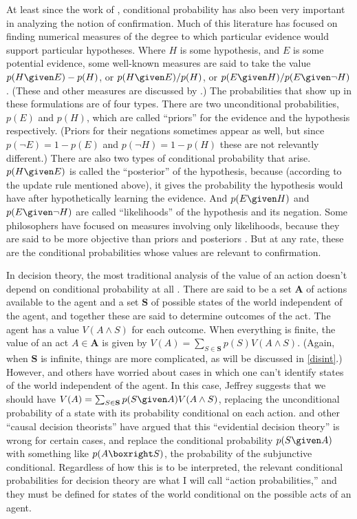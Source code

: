 At least since the work of \citet{jhl}, conditional probability has also been very important in analyzing the notion of confirmation. Much of this literature has focused on finding numerical measures of the degree to which particular evidence would support particular hypotheses. Where $H$ is some hypothesis, and $E$ is some potential evidence, some well-known measures are said to take the value $p(H \given E)-p(H)$, or $p(H \given E)/p(H)$, or $p(E \given H)/p(E \given \lnot H)$. (These and other measures are discussed by \citealp{meassens}.) The probabilities that show up in these formulations are of four types. There are two unconditional probabilities, $p(E)$ and $p(H)$, which are called ``priors'' for the evidence and the hypothesis respectively. (Priors for their negations sometimes appear as well, but since $p(\lnot E)=1-p(E)$ and $p(\lnot H)=1-p(H)$ these are not relevantly different.) There are also two types of conditional probability that arise. $p(H \given E)$ is called the ``posterior'' of the hypothesis, because (according to the update rule mentioned above), it gives the probability the hypothesis would have after hypothetically learning the evidence. And $p(E \given H)$ and $p(E \given \lnot H)$ are called ``likelihoods'' of the hypothesis and its negation. Some philosophers have focused on measures involving only likelihoods, because they are said to be more objective than priors and posteriors \citep{royall}. But at any rate, these are the conditional probabilities whose values are relevant to confirmation.

In decision theory, the most traditional analysis of the value of an action doesn't depend on conditional probability at all \citep{savage}. There are said to be a set $\mathbf{A}$ of actions available to the agent and a set $\mathbf{S}$ of possible states of the world independent of the agent, and together these are said to determine outcomes of the act. The agent has a value $V(A\land S)$ for each outcome. When everything is finite, the value of an act $A\in\mathbf{A}$ is given by $V(A)=\sum_{S\in\mathbf{S}}p(S)V(A\land S)$. (Again, when $\mathbf{S}$ is infinite, things are more complicated, as will be discussed in \autoref{disint}.) However, \citet{jeffrey} and others have worried about cases in which one can't identify states of the world independent of the agent. In this case, Jeffrey suggests that we should have $V(A)=\sum_{S\in\mathbf{S}}p(S \given A)V(A\land S)$, replacing the unconditional probability of a state with its probability conditional on each action. \citet{joyce} and other ``causal decision theorists'' have argued that this ``evidential decision theory'' is wrong for certain cases, and replace the conditional probability $p(S \given A)$ with something like $p(A\boxright S)$, the probability of the subjunctive conditional. Regardless of how this is to be interpreted, the relevant conditional probabilities for decision theory are what I will call ``action probabilities,'' and they must be defined for states of the world conditional on the possible acts of an agent.

